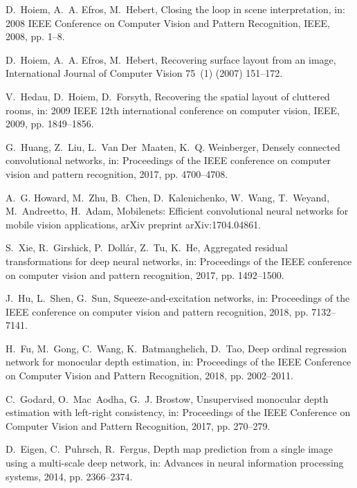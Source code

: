 \documentclass[5p]{elsarticle}
\begin{document}
\begin{thebibliography}{100}
D.~Hoiem, A.~A. Efros, M.~Hebert, Closing the loop in scene interpretation, in:
  2008 IEEE Conference on Computer Vision and Pattern Recognition, IEEE, 2008,
  pp. 1--8.

D.~Hoiem, A.~A. Efros, M.~Hebert, Recovering surface layout from an image,
  International Journal of Computer Vision 75~(1) (2007) 151--172.

V.~Hedau, D.~Hoiem, D.~Forsyth, Recovering the spatial layout of cluttered
  rooms, in: 2009 IEEE 12th international conference on computer vision, IEEE,
  2009, pp. 1849--1856.

G.~Huang, Z.~Liu, L.~Van Der~Maaten, K.~Q. Weinberger, Densely connected
  convolutional networks, in: Proceedings of the IEEE conference on computer
  vision and pattern recognition, 2017, pp. 4700--4708.

A.~G. Howard, M.~Zhu, B.~Chen, D.~Kalenichenko, W.~Wang, T.~Weyand,
  M.~Andreetto, H.~Adam, Mobilenets: Efficient convolutional neural networks
  for mobile vision applications, arXiv preprint arXiv:1704.04861.

S.~Xie, R.~Girshick, P.~Doll{\'a}r, Z.~Tu, K.~He, Aggregated residual
  transformations for deep neural networks, in: Proceedings of the IEEE
  conference on computer vision and pattern recognition, 2017, pp. 1492--1500.

J.~Hu, L.~Shen, G.~Sun, Squeeze-and-excitation networks, in: Proceedings of the
  IEEE conference on computer vision and pattern recognition, 2018, pp.
  7132--7141.

H.~Fu, M.~Gong, C.~Wang, K.~Batmanghelich, D.~Tao, Deep ordinal regression
  network for monocular depth estimation, in: Proceedings of the IEEE
  Conference on Computer Vision and Pattern Recognition, 2018, pp. 2002--2011.

C.~Godard, O.~Mac~Aodha, G.~J. Brostow, Unsupervised monocular depth estimation
  with left-right consistency, in: Proceedings of the IEEE Conference on
  Computer Vision and Pattern Recognition, 2017, pp. 270--279.

D.~Eigen, C.~Puhrsch, R.~Fergus, Depth map prediction from a single image using
  a multi-scale deep network, in: Advances in neural information processing
  systems, 2014, pp. 2366--2374.


\end{thebibliography}
\end{document}
